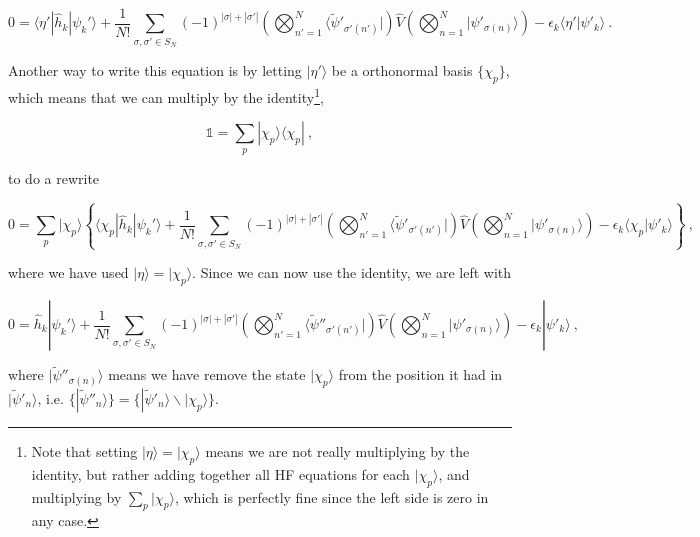 \documentclass[10pt,twoside]{report}
\begin{document}
	\begin{equation}
		0 = \langle\eta'|\hat{h}_k|\psi_k'\rangle + \frac{1}{N!}\sum_{\sigma,\sigma'\in S_N} (-1)^{|\sigma|+|\sigma'|}\left(\bigotimes_{n'=1}^N \langle\widetilde{\psi}'_{\sigma'(n')}|\right)\hat{V}\left(\bigotimes_{n=1}^N |\psi'_{\sigma(n)}\rangle\right)
		- \epsilon_k\langle\eta'|\psi'_k\rangle \:.
		\label{MBQM | eq | "HF general equation"}
	\end{equation}
	
	Another way to write this equation is by letting $|\eta'\rangle$ be a orthonormal basis $\{\chi_p\}$, which means that we can multiply by the identity\footnote{Note that setting $|\eta\rangle = |\chi_p\rangle$ means we are not really multiplying by the identity, but rather adding together all HF equations for each $|\chi_p\rangle$, and multiplying by $\sum_p|\chi_p\rangle$, which is perfectly fine since the left side is zero in any case.},
	
	\begin{equation}
		\mathds{1} = \sum_p |\chi_p\rangle\langle \chi_p| \:,
	\end{equation}
	
	\noindent to do a rewrite
	
	\begin{equation}
		0 = \sum_p|\chi_p\rangle \left\{\langle\chi_p|\hat{h}_k|\psi_k'\rangle + \frac{1}{N!}\sum_{\sigma,\sigma'\in S_N} (-1)^{|\sigma|+|\sigma'|}\left(\bigotimes_{n'=1}^N \langle\widetilde{\psi}'_{\sigma'(n')}|\right)\hat{V}\left(\bigotimes_{n=1}^N |\psi'_{\sigma(n)}\rangle\right)
		- \epsilon_k\langle\chi_p|\psi'_k\rangle\right\} \:,
	\end{equation}
	
	\noindent where we have used $|\eta\rangle = |\chi_p\rangle$. Since we can now use the identity, we are left with
	
	\begin{equation}
	0 = \hat{h}_k|\psi_k'\rangle + \frac{1}{N!}\sum_{\sigma,\sigma'\in S_N} (-1)^{|\sigma|+|\sigma'|}\left(\bigotimes_{n'=1}^N \langle\widetilde{\psi}''_{\sigma'(n')}|\right)\hat{V}\left(\bigotimes_{n=1}^N |\psi'_{\sigma(n)}\rangle\right)
	- \epsilon_k|\psi'_k\rangle \:,
	\label{MBQM | eq | "HF alt general equation"}
	\end{equation}
	
	\noindent where $|\widetilde{\psi}''_{\sigma(n)}\rangle$ means we have remove the state $|\chi_p\rangle$ from the position it had in $|\widetilde{\psi}'_n\rangle$, i.e. $\{|\widetilde{\psi}''_n\rangle\} = \{|\widetilde{\psi}'_n\rangle \backslash |\chi_p\rangle\}$.\\
	
\end{document}
